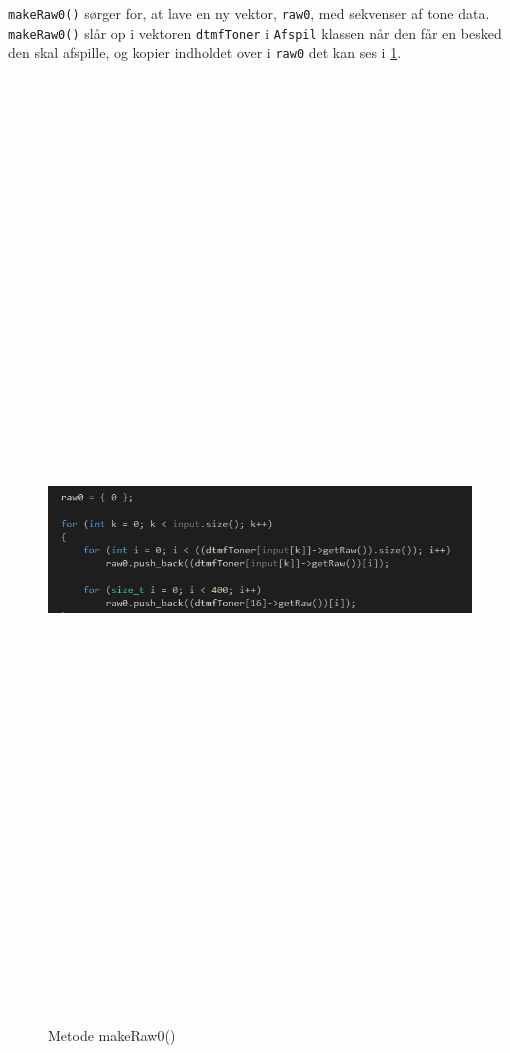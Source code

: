 \texttt{makeRaw0()} sørger for, at lave en ny vektor, \texttt{\textcolor{dkgreen}{raw0}}, med sekvenser af tone data. \texttt{makeRaw0()} slår op i vektoren \texttt{\textcolor{dkgreen}{dtmfToner}} i \texttt{Afspil} klassen når den får en besked den skal afspille, og kopier indholdet over i \texttt{\textcolor{dkgreen}{raw0}} det kan ses i \ref{fig:makeRaw0}.
\begin{figure}[ht]
	\centering
	\includegraphics[width=15cm,height=25cm,keepaspectratio]{pictures/makeRaw0.PNG}
	\caption{Metode makeRaw0()}
	\label{fig:makeRaw0}
\end{figure}
